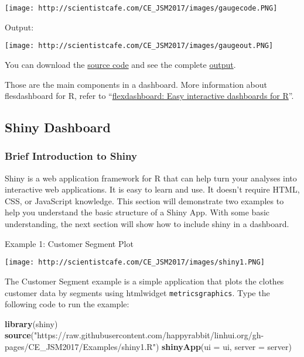 \documentclass[
]{article}
\newenvironment{Shaded}{\begin{snugshade}}{\end{snugshade}}
\newcommand{\DataTypeTok}[1]{\textcolor[rgb]{0.13,0.29,0.53}{#1}}
\newcommand{\KeywordTok}[1]{\textcolor[rgb]{0.13,0.29,0.53}{\textbf{#1}}}
\newcommand{\NormalTok}[1]{#1}
\newcommand{\StringTok}[1]{\textcolor[rgb]{0.31,0.60,0.02}{#1}}
\begin{document}
\texttt{[image: http://scientistcafe.com/CE\_JSM2017/images/gaugecode.PNG]}

Output:

\texttt{[image: http://scientistcafe.com/CE\_JSM2017/images/gaugeout.PNG]}

You can download the
\href{http://scientistcafe.com/CE_JSM2017/Examples/gauge.Rmd}{source
code} and see the complete
\href{http://scientistcafe.com/CE_JSM2017/Examples/gauge.html}{output}.

Those are the main components in a dashboard. More information about
flesdashboard for R, refer to
``\href{http://rmarkdown.rstudio.com/flexdashboard/index.html}{flexdashboard:
Easy interactive dashboards for R}''.

\hypertarget{shiny-dashboard}{%
\subsection{Shiny Dashboard}\label{shiny-dashboard}}

\hypertarget{brief-introduction-to-shiny}{%
\subsubsection{Brief Introduction to
Shiny}\label{brief-introduction-to-shiny}}

Shiny is a web application framework for R that can help turn your
analyses into interactive web applications. It is easy to learn and use.
It doesn't require HTML, CSS, or JavaScript knowledge. This section will
demonstrate two examples to help you understand the basic structure of a
Shiny App. With some basic understanding, the next section will show how
to include shiny in a dashboard.

Example 1: Customer Segment Plot

\texttt{[image: http://scientistcafe.com/CE\_JSM2017/images/shiny1.PNG]}

The Customer Segment example is a simple application that plots the
clothes customer data by segments using htmlwidget
\texttt{metricsgraphics}. Type the following code to run the example:

\begin{Shaded}
\begin{Highlighting}[]
\KeywordTok{library}\NormalTok{(shiny)}
\KeywordTok{source}\NormalTok{(}\StringTok{"https://raw.githubusercontent.com/happyrabbit/linhui.org/gh-pages/CE_JSM2017/Examples/shiny1.R"}\NormalTok{)}
\KeywordTok{shinyApp}\NormalTok{(}\DataTypeTok{ui =}\NormalTok{ ui, }\DataTypeTok{server =}\NormalTok{ server)}
\end{Highlighting}
\end{Shaded}
\end{document}
